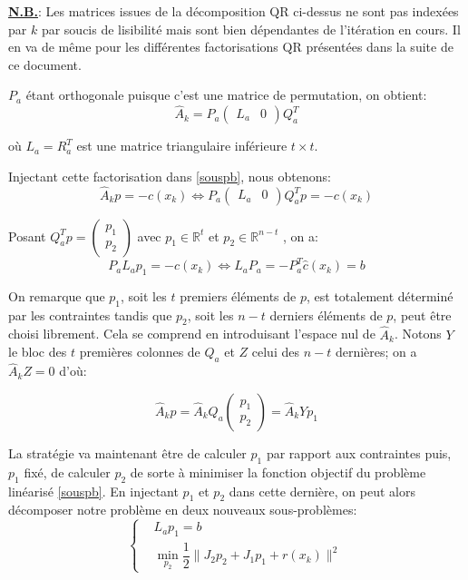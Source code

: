 \documentclass[a4paper,11pt]{article}
\newcommand{\real}{\mathbb{R}}
\newcommand{\ha}{\hat{A}}
\newcommand{\hc}{\hat{c}}
\numberwithin{equation}{section}
\begin{document}
\textbf{\underline{N.B.}}: Les matrices issues de la décomposition QR ci-dessus ne sont pas indexées par $k$ par soucis de lisibilité mais sont bien dépendantes de l'itération en cours. Il en va de même pour les différentes factorisations QR présentées dans la suite de ce document.

$P_{a}$ étant orthogonale puisque c'est une matrice de permutation, on obtient:
\begin{equation}
\ha_{k} = P_{a}
\begin{pmatrix}
L_{a} & 0
\end{pmatrix}
Q_{a}^{T}
\end{equation}

où $L_{a}=R_{a}^{T}$ est une matrice triangulaire inférieure $t \times t$.

Injectant cette factorisation dans \eqref{souspb}, nous obtenons: 
\[
\ha_{k}p = -c(x_{k}) \Longleftrightarrow P_{a}\begin{pmatrix}
L_{a} & 0
\end{pmatrix}
Q_{a}^{T}p = -c(x_{k})
\]

Posant $Q_{a}^{T}p = \begin{pmatrix}
p_{1} \\ p_{2}
\end{pmatrix}$ avec $p_{1} \in \real^{t}$ et $p_{2} \in \real^{n-t}$ , on a:
\[
P_{a}L_{a}p_{1} = -\hc(x_{k}) \Longleftrightarrow L_{a}P_{a} = -P_{a}^{T}\hc(x_{k}) = b
\]

On remarque que $p_{1}$, soit les $t$ premiers éléments de $p$, est totalement déterminé par les contraintes tandis que $p_{2}$, soit les $n-t$ derniers éléments de $p$, peut être choisi librement. Cela se comprend en introduisant l'espace nul de $\ha_{k}$. Notons $Y$ le bloc des $t$ premières colonnes de $Q_{a}$ et $Z$ celui des $n-t$ dernières;  on a $\ha_{k}Z=0$ d'où:

$$
\ha_{k}p = \ha_{k}Q_{a} \begin{pmatrix}
p_{1}\\p_{2}
\end{pmatrix}=\ha_{k}Yp_{1}
$$

La stratégie va maintenant être de calculer $p_{1}$ par rapport aux contraintes puis, $p_{1}$ fixé, de calculer $p_{2}$ de sorte à minimiser la fonction objectif du problème linéarisé \eqref{souspb}. En injectant $p_{1}$ et $p_{2}$ dans cette dernière, on peut alors décomposer notre problème en deux nouveaux sous-problèmes:
\[
\left\{
\begin{aligned}
&L_{a}p_{1} = b \\
&\underset{p_{2}}{\min} \dfrac{1}{2}\|J_{2}p_{2} + J_{1}p_{1} + r(x_{k})\|^{2}
\end{aligned}\right.
\]
\end{document}
